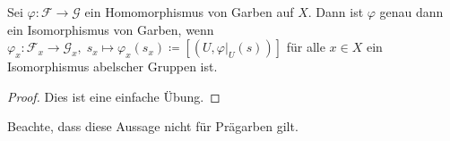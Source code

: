 \begin{prop}
	Sei $\varphi: \mathcal{F} \to \mathcal{G}$ ein Homomorphismus von Garben auf $X$. Dann ist $\varphi$ genau dann ein Isomorphismus von Garben, wenn $\varphi_x:\mathcal{F}_x \to \mathcal{G}_x,\; s_x \mapsto \varphi_x(s_x) \coloneqq [(U,\varphi\vert_U(s))]$ für alle $x \in X$ ein Isomorphismus abelscher Gruppen ist.
	\begin{proof}
		Dies ist eine einfache Übung.
	\end{proof}
	Beachte, dass diese Aussage nicht für Prägarben gilt.
\end{prop}